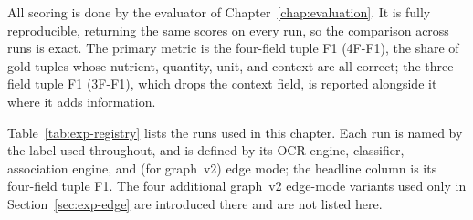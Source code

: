All scoring is done by the evaluator of Chapter~\ref{chap:evaluation}. It
is fully reproducible, returning the same scores on every run, so the
comparison across runs is exact. The primary metric is the four-field
tuple F1 (4F-F1), the share of gold tuples whose nutrient, quantity,
unit, and context are all correct; the three-field tuple F1 (3F-F1),
which drops the context field, is reported alongside it where it adds
information.

Table~\ref{tab:exp-registry} lists the runs used in this chapter. Each run
is named by the label used throughout, and is defined by its OCR engine,
classifier, association engine, and (for graph~v2) edge mode; the headline
column is its four-field tuple F1. The four additional graph~v2
edge-mode variants used only in Section~\ref{sec:exp-edge} are introduced
there and are not listed here.

